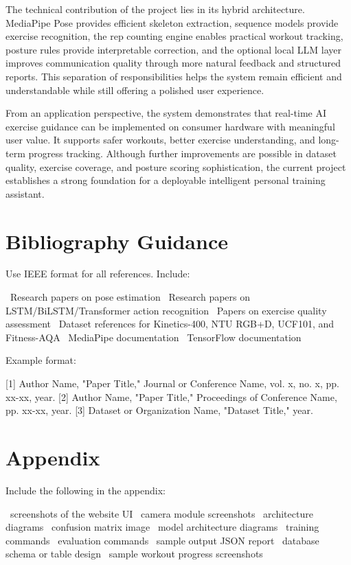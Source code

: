 \documentclass[12pt,a4paper]{report}
\begin{document}
The technical contribution of the project lies in its hybrid architecture. MediaPipe Pose provides efficient skeleton extraction, sequence models provide exercise recognition, the rep counting engine enables practical workout tracking, posture rules provide interpretable correction, and the optional local LLM layer improves communication quality through more natural feedback and structured reports. This separation of responsibilities helps the system remain efficient and understandable while still offering a polished user experience.

From an application perspective, the system demonstrates that real-time AI exercise guidance can be implemented on consumer hardware with meaningful user value. It supports safer workouts, better exercise understanding, and long-term progress tracking. Although further improvements are possible in dataset quality, exercise coverage, and posture scoring sophistication, the current project establishes a strong foundation for a deployable intelligent personal training assistant.


\chapter*{Bibliography Guidance}

Use IEEE format for all references. Include:

\noindent\textbullet\ Research papers on pose estimation  
\noindent\textbullet\ Research papers on LSTM/BiLSTM/Transformer action recognition  
\noindent\textbullet\ Papers on exercise quality assessment  
\noindent\textbullet\ Dataset references for Kinetics-400, NTU RGB+D, UCF101, and Fitness-AQA  
\noindent\textbullet\ MediaPipe documentation  
\noindent\textbullet\ TensorFlow documentation  

Example format:

[1] Author Name, "Paper Title," Journal or Conference Name, vol. x, no. x, pp. xx-xx, year.  
[2] Author Name, "Paper Title," Proceedings of Conference Name, pp. xx-xx, year.  
[3] Dataset or Organization Name, "Dataset Title," year.  


\chapter*{Appendix}

Include the following in the appendix:

\noindent\textbullet\ screenshots of the website UI  
\noindent\textbullet\ camera module screenshots  
\noindent\textbullet\ architecture diagrams  
\noindent\textbullet\ confusion matrix image  
\noindent\textbullet\ model architecture diagrams  
\noindent\textbullet\ training commands  
\noindent\textbullet\ evaluation commands  
\noindent\textbullet\ sample output JSON report  
\noindent\textbullet\ database schema or table design  
\noindent\textbullet\ sample workout progress screenshots  
\end{document}
